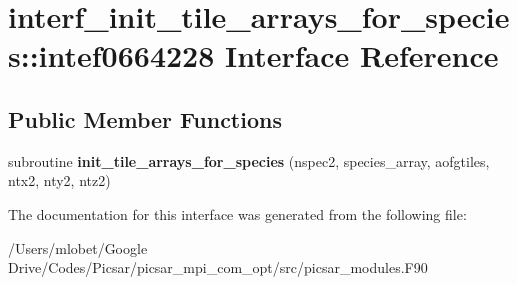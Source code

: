 \hypertarget{interfaceinterf__init__tile__arrays__for__species_1_1intef0664228}{}\section{interf\+\_\+init\+\_\+tile\+\_\+arrays\+\_\+for\+\_\+species\+:\+:intef0664228 Interface Reference}
\label{interfaceinterf__init__tile__arrays__for__species_1_1intef0664228}
\subsection*{Public Member Functions}
\begin{DoxyCompactItemize}
\item 
subroutine {\bfseries init\+\_\+tile\+\_\+arrays\+\_\+for\+\_\+species} (nspec2, species\+\_\+array, aofgtiles, ntx2, nty2, ntz2)\hypertarget{interfaceinterf__init__tile__arrays__for__species_1_1intef0664228_a2ab4ed6b6ed96bbe4c7d8aa31854c424}{}\label{interfaceinterf__init__tile__arrays__for__species_1_1intef0664228_a2ab4ed6b6ed96bbe4c7d8aa31854c424}

\end{DoxyCompactItemize}


The documentation for this interface was generated from the following file\+:\begin{DoxyCompactItemize}
\item 
/\+Users/mlobet/\+Google Drive/\+Codes/\+Picsar/picsar\+\_\+mpi\+\_\+com\+\_\+opt/src/picsar\+\_\+modules.\+F90\end{DoxyCompactItemize}
